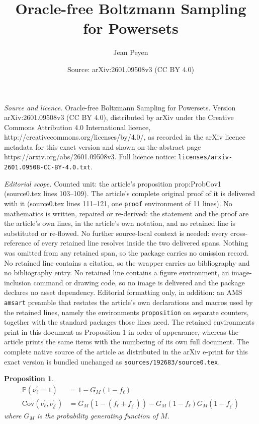 \documentclass[10pt,a4paper]{amsart}
\title{Oracle-free Boltzmann Sampling for Powersets}
\author{Jean Peyen}
\date{Source: arXiv:2601.09508v3 (CC BY 4.0)}
\newtheorem{proposition}{Proposition}
\newcommand{\PP}{\mathbb{P}}
\newcommand{\cov}{\mathrm{Cov}}
\begin{document}
\maketitle

\noindent\emph{Source and licence.} Oracle-free Boltzmann Sampling for Powersets. Version arXiv:2601.09508v3 (CC BY 4.0), distributed by arXiv under the Creative Commons Attribution 4.0 International licence, http://creativecommons.org/licenses/by/4.0/, as recorded in the arXiv licence metadata for this exact version and shown on the abstract page https://arxiv.org/abs/2601.09508v3. Full licence notice: \texttt{licenses/arxiv-2601.09508-CC-BY-4.0.txt}.\par\smallskip

\noindent\textit{Editorial scope.} Counted unit: the article's proposition prop:ProbCov1 (source0.tex lines 103--109). The article's complete original proof of it is delivered with it (source0.tex lines 111--121, one \texttt{proof} environment of 11 lines). No mathematics is written, repaired or re-derived: the statement and the proof are the article's own lines, in the article's own notation, and no retained line is substituted or re-flowed.  No further source-local context is needed: every cross-reference of every retained line resolves inside the two delivered spans.  Nothing was omitted from any retained span, so the package carries no omission record.  No retained line contains a citation, so the wrapper carries no bibliography and no bibliography entry.  No retained line contains a figure environment, an image-inclusion command or drawing code, so no image is delivered and the package declares no asset dependency.  Editorial formatting only, in addition: an AMS \texttt{amsart} preamble that restates the article's own declarations and macros used by the retained lines, namely the environments \texttt{proposition} on separate counters, together with the standard packages those lines need.  The retained environments print in this document as Proposition 1 in order of appearance, whereas the article prints the same items with the numbering of its own full document.  The complete native source of the article as distributed in the arXiv e-print for this exact version is bundled unchanged as \texttt{sources/192683/source0.tex}.
\begin{proposition}\label{prop:ProbCov1}
\begin{align}
    \PP(\nu^{\prime}_\ell = 1) &= 1-G_M(1-f_\ell) \label{eq:Prob1}\\
    \cov(\nu^{\prime}_\ell, \nu^{\prime}_{\ell^\prime}) &= G_M(1-(f_\ell+f_{\ell^\prime}))-G_M(1-f_\ell)G_M(1-f_{\ell^\prime}) \label{eq:Cov1}
\end{align}
where $G_M$ is the probability generating function of $M$.
\end{proposition}
\end{document}
